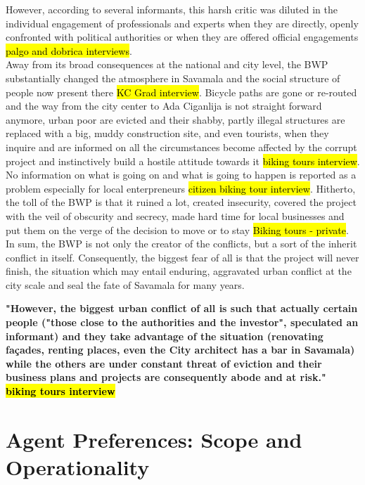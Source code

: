 \documentclass[11pt]{report}
\begin{document}
However, according to several informants, this harsh critic was diluted in the individual engagement of professionals and experts when they are directly, openly confronted with political authorities or when they are offered official engagements \hl{palgo and dobrica interviews}.
\\
Away from its broad consequences at the national and city level, the BWP substantially changed the atmosphere in Savamala and the social structure of people now present there
\hl{KC Grad interview}. Bicycle paths are gone or re-routed and the way from the city center to Ada Ciganlija is not straight forward anymore, urban poor are evicted and their shabby, partly illegal structures are replaced with a big, muddy construction site, and even tourists, when they inquire and are informed on all the circumstances become affected by the corrupt project and instinctively build a hostile attitude towards it \hl{biking tours interview}.
No information on what is going on and what is going to happen is reported as a problem especially for local enterpreneurs \hl{citizen biking tour interview}.
Hitherto, the toll of the BWP is that it ruined a lot, created insecurity, covered the project with the veil of obscurity and secrecy, made hard time for local businesses and put them on the verge of the decision to move or to stay
\hl{Biking tours - private}.
In sum, the BWP is not only the creator of the conflicts, but a sort of the inherit conflict in itself.
Consequently, the biggest fear of all is that the project will never finish, the situation which may entail enduring, aggravated urban conflict at the city scale and seal the fate of Savamala for many years.

\textbf{"However, the biggest urban conflict of all is such that actually certain people ("those close to the authorities and the investor", speculated an informant)  and they take advantage of the situation (renovating façades, renting places, even the City architect has a bar in Savamala) while the others are under constant threat of eviction and their business plans and projects are consequently abode and at risk." \hl{biking tours interview}}

\section{Agent Preferences: Scope and Operationality}
\end{document}
